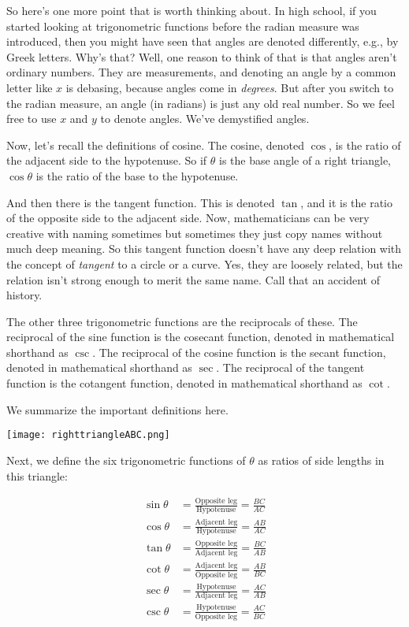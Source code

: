 \documentclass{amsart}
\begin{document}
So here's one more point that is worth thinking about. In high school,
if you started looking at trigonometric functions before the radian
measure was introduced, then you might have seen that angles are
denoted differently, e.g., by Greek letters. Why's that? Well, one
reason to think of that is that angles aren't ordinary numbers. They
are measurements, and denoting an angle by a common letter like $x$ is
debasing, because angles come in {\em degrees}. But after you switch
to the radian measure, an angle (in radians) is just any old real
number. So we feel free to use $x$ and $y$ to denote angles. We've
demystified angles.

Now, let's recall the definitions of cosine. The cosine, denoted
$\cos$, is the ratio of the adjacent side to the hypotenuse. So if
$\theta$ is the base angle of a right triangle, $\cos \theta$ is the
ratio of the base to the hypotenuse.

And then there is the tangent function. This is denoted $\tan$, and it
is the ratio of the opposite side to the adjacent side. Now,
mathematicians can be very creative with naming sometimes but
sometimes they just copy names without much deep meaning. So this
tangent function doesn't have any deep relation with the concept of
{\em tangent} to a circle or a curve. Yes, they are loosely related,
but the relation isn't strong enough to merit the same name. Call that
an accident of history.

The other three trigonometric functions are the reciprocals of
these. The reciprocal of the sine function is the cosecant function,
denoted in mathematical shorthand as $\csc$. The reciprocal of the
cosine function is the secant function, denoted in mathematical
shorthand as $\sec$. The reciprocal of the tangent function is the
cotangent function, denoted in mathematical shorthand as $\cot$.

We summarize the important definitions here.

\texttt{[image: righttriangleABC.png]}

Next, we define the six trigonometric functions of $\theta$ as ratios
of side lengths in this triangle:

\begin{align*}
  \sin \theta & = \frac{\text{Opposite leg}}{\text{Hypotenuse}} = \frac{BC}{AC}\\
  \cos \theta & = \frac{\text{Adjacent leg}}{\text{Hypotenuse}} = \frac{AB}{AC}\\
  \tan \theta & = \frac{\text{Opposite leg}}{\text{Adjacent leg}} = \frac{BC}{AB}\\
  \cot \theta & = \frac{\text{Adjacent leg}}{\text{Opposite leg}} =\frac{AB}{BC}\\
  \sec \theta & = \frac{\text{Hypotenuse}}{\text{Adjacent leg}} = \frac{AC}{AB}\\
  \csc \theta & = \frac{\text{Hypotenuse}}{\text{Opposite leg}} =\frac{AC}{BC}
\end{align*}
\end{document}

